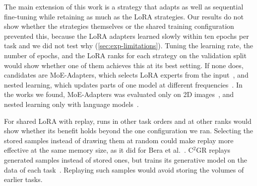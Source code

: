 The main extension of this work is a strategy that adapts as well as sequential fine-tuning while retaining as much as the LoRA strategies.
Our results do not show whether the strategies themselves or the shared training configuration prevented this, because the LoRA adapters learned slowly within ten epochs per task and we did not test why (\cref{sec:exp-limitations}).
Tuning the learning rate, the number of epochs, and the LoRA ranks for each strategy on the validation split would show whether one of them achieves this at its best setting.
If none does, candidates are MoE-Adapters, which selects LoRA experts from the input~\cite{yu2024boostingcontinuallearningvisionlanguage}, and nested learning, which updates parts of one model at different frequencies~\cite{behrouz2025nestedlearning}.
In the works we found, MoE-Adapters was evaluated only on 2D images~\cite{yu2024boostingcontinuallearningvisionlanguage,gao2026medcrpcl}, and nested learning only with language models~\cite[Sec.~4]{behrouz2025nestedlearning}.

For shared LoRA with replay, runs in other task orders and at other ranks would show whether its benefit holds beyond the one configuration we ran.
Selecting the stored samples instead of drawing them at random could make replay more effective at the same memory size, as it did for Bera et al.~\cite[Table~1]{memory_replay_cropping}.
C$^2$GR replays generated samples instead of stored ones, but trains its generative model on the data of each task~\cite[Sec.~3.3]{li2026c2gr}.
Replaying such samples would avoid storing the volumes of earlier tasks.

